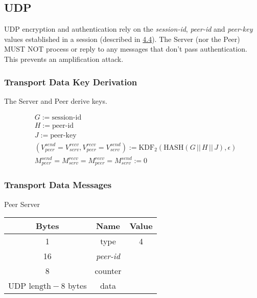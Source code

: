 \subsection{UDP}

UDP encryption and authentication rely on the \emph{session-id}, \emph{peer-id} and \emph{peer-key} values
established in a session
(described in \hyperlink{subsection.4.4}{4.4}). The Server (nor the Peer) MUST NOT
process or reply to any messages that don't pass authentication. This prevents an amplification attack.\\

\subsubsection{Transport Data Key Derivation}

The Server and Peer derive keys.

\begin{align*}
    &  G:= \text{session-id}                                                               \\
    &  H := \text{peer-id}                                                                \\
    &  J := \text{peer-key}                                                              \\
    &  (V_{peer}^{send} = V_{serv}^{recv}, V_{peer}^{recv} = V_{serv}^{send}) := \text{KDF}_2(\text{HASH}(G\,
    ||\, H\,||\, J), \epsilon)                                        \\
    &   M_{peer}^{send} = M_{serv}^{recv} = M_{peer}^{recv} = M_{serv}^{send} := 0
\end{align*}

\subsubsection{Transport Data Messages}

\begin{center}
    Peer \textrightarrow Server\\
    \begin{tabular}{|c|c|c|}
        \hline
        \textbf{Bytes}                & \textbf{Name}  & \textbf{Value} \\
        \hline
        1                             & type           & 4              \\
        \hline
        16                            & \emph{peer-id} &                \\
        \hline
        8                             & counter        &                \\
        \hline
        $\text{UDP length} - 8$ bytes & data           &                \\
        \hline
    \end{tabular}
\end{center}

